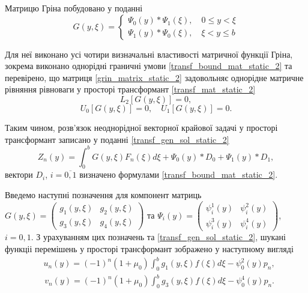 Матрицю Гріна побудовано у поданні
\begin{equation}\label{grin_matrix_static_2}
    G(y,\xi) = 
    \begin{cases}
        \Psi_0(y) * \Psi_1(\xi), \quad 0 \le y < \xi \\
        \Psi_1(y) * \Psi_0(\xi), \quad \xi < y \le b
    \end{cases}
\end{equation}

Для неї виконано усі чотири визначальні властивості матричної функції Гріна, зокрема виконано однорідні граничні умови \eqref{transf_bound_mat_static_2}
та перевірено, що матриця \eqref{grin_matrix_static_2} задовольняє однорідне матричне рівняння рівноваги у просторі трансформант \eqref{transf_mat_static_2}
\begin{equation*}
    L_2\left[  G(y, \xi) \right] = 0,
\end{equation*}
\begin{equation*}
    U_0\left[ G(y, \xi) \right] = 0, \quad  U_1\left[ G(y, \xi) \right] = 0.
\end{equation*}

Таким чином, розв'язок неоднорідної векторної крайової задачі у просторі трансформант записано у поданні \eqref{transf_gen_sol_static_2}
\begin{equation}
    Z_n(y) = \int_0^b G(y,\xi) F_n(\xi) d\xi + \Psi_0(y) * D_0 + \Psi_1(y) * D_1,
\end{equation}
вектори $D_i$, $i=\overline{0,1}$ визначено формулами \eqref{transf_bound_mat_static_2}.

Введемо наступні позначення для компонент матриць
\newline $G(y, \xi) = \begin{pmatrix}
    g_1(y,\xi) & g_2(y,\xi) \\
    g_3(y,\xi) & g_4(y,\xi)
\end{pmatrix}$ та $\Psi_i(y) = \begin{pmatrix}
    \psi_i^1(y) & \psi_i^2(y) \\
    \psi_i^3(y) & \psi_i^4(y)
\end{pmatrix}$, $i=0,1$.
\newline З урахуванням цих позначень та \eqref{transf_gen_sol_static_2}, шукані функціі перемішень у просторі трансформант зображено у наступному вигляді
\begin{align}\label{transf_sol_u_static_2}
    &u_n(y) = (-1)^n (1+\mu_0) \int_0^b g_1(y, \xi)f(\xi) d\xi - \psi_0^2(y) p_n,
\end{align}
\begin{align}\label{transf_sol_v_static_2}
    &v_n(y) = (-1)^n (1+\mu_0)  \int_0^b g_3(y, \xi)f(\xi) d\xi - \psi_0^4(y) p_n.
\end{align}

